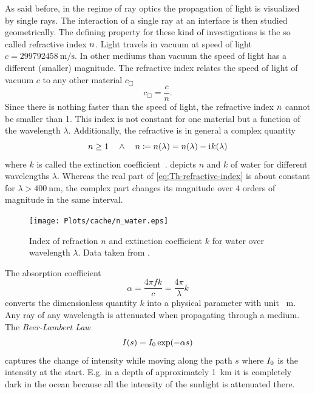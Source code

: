 As said before, in the regime of ray optics the propagation of light is 
visualized by single rays. The interaction of a single ray at an interface is 
then studied geometrically. The defining property for these kind of 
investigations is the so called refractive index $n$. Light travels 
in vacuum at speed of light $c=\SI{299792458}{\m\per\s}$. In other mediums than 
vacuum the speed of light has a different (smaller) magnitude. The refractive 
index relates the speed of light of vacuum $c$ to any other material $c_{\Box}$
\begin{equation}
  c_{\Box} = \frac{c}{n}.
  \label{eq:Th-lightspeed}
\end{equation}
Since there is nothing faster than the speed of light, the refractive index 
$n$ cannot be smaller than 1. This index is not constant for one 
material but a function of the wavelength $\lambda$. Additionally, the 
refractive is in general a complex quantity
\begin{equation}
  n\geq 1 \quad \wedge \quad n \coloneqq 
  n(\lambda) = n(\lambda) - \mathrm{i}\mkern1mu k(\lambda)
  \label{eq:Th-refractive-index}
\end{equation}
where $k$ is called the extinction coefficient~\cite{Jackson2013}. 
 depicts $n$ and $k$ of water for different wavelengths 
$\lambda$. Whereas the real part of \cref{eq:Th-refractive-index} is about 
constant for $\lambda > \SI{400}{\nm}$, the complex part changes its magnitude 
over 4 orders of magnitude in the same interval.

\begin{figure}[tbp]
  \centering
  \texttt{[image: Plots/cache/n\_water.eps]}
  \caption{Index of refraction $n$ and extinction coefficient $k$ for water 
  over wavelength $\lambda$. Data taken from \cite{Hale1973,Segelstein1981}.}
  \label{fig:Th-n_water}
\end{figure}


The absorption coefficient~\cite{Hecht2017}
\begin{equation}
  \alpha = \frac{4\pi f k}{c} = \frac{4\pi}{\lambda}k
  \label{eq:Th-alpha}
\end{equation}
converts the dimensionless quantity $k$ into a physical parameter with unit 
\si{\per\meter}. Any ray of any wavelength is attenuated when propagating 
through a medium. The \emph{Beer-Lambert Law}
\begin{equation}
  I(s) = I_{0}\exp(-\alpha s)
  \label{eq:Th-beer-lambert}
\end{equation}
captures the change of intensity while moving along the path $s$ where 
$I_{0}$ is the intensity at the start. E.g. in a depth of 
approximately \SI{1}{\kilo\meter} it is completely dark in the ocean because 
all the intensity of the sunlight is attenuated there.

